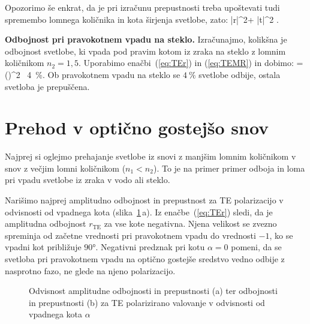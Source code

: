 Opozorimo še enkrat, da je pri izračunu prepustnosti treba upoštevati tudi 
spremembo lomnega količnika in kota širjenja svetlobe, zato:
\beq
|r|^2+ |t|^2 .
\label{eq:04_48}
\eeq

\begin{example}{\bf Odbojnost pri pravokotnem vpadu na steklo.} 
Izračunajmo, kolikšna je odbojnost svetlobe, ki vpada pod pravim kotom iz zraka na
steklo z lomnim količnikom $n_2=1,5$. Uporabimo enačbi~(\ref{eq:TEr}) in (\ref{eq:TEMR})
in dobimo:
\beq
{} = \left(\right)^2 \approx~4~\%.
\label{eq:04_49}
\eeq
Ob pravokotnem vpadu na steklo se $4~\%$ svetlobe odbije, ostala 
svetloba je prepuščena.
\end{example}

\section{Prehod v optično gostejšo snov}
Najprej si oglejmo prehajanje svetlobe iz snovi z manjšim lomnim
količnikom v snov z večjim lomni količnikom ($n_1<n_2$). To je na primer
primer odboja in loma pri vpadu svetlobe iz zraka v vodo ali steklo. 

Narišimo najprej amplitudno odbojnost in prepustnost za TE polarizacijo v odvisnosti
od vpadnega kota (slika~\ref{fig:04_redte}\,a). 
Iz enačbe~(\ref{eq:TEr}) sledi, da je amplitudna odbojnost $r_\mathrm{TE}$
za vse kote negativna. Njena velikost se zvezno spreminja od začetne vrednosti
pri pravokotnem vpadu do vrednosti $-1$, ko se vpadni kot približuje $90\si{\degree}$.
Negativni predznak pri kotu $\alpha =0$ pomeni, da se svetloba pri 
pravokotnem vpadu na optično gostejše sredstvo vedno odbije z nasprotno fazo, ne 
glede na njeno polarizacijo.
\begin{figure}[ht]
\centering
\def\svgwidth{140truemm} 

\caption{Odvisnost amplitudne odbojnosti in prepustnosti (a) ter odbojnosti in 
prepustnosti (b) za TE polarizirano valovanje v odvisnosti od vpadnega kota $\alpha$}
\label{fig:04_redte}
\end{figure}

